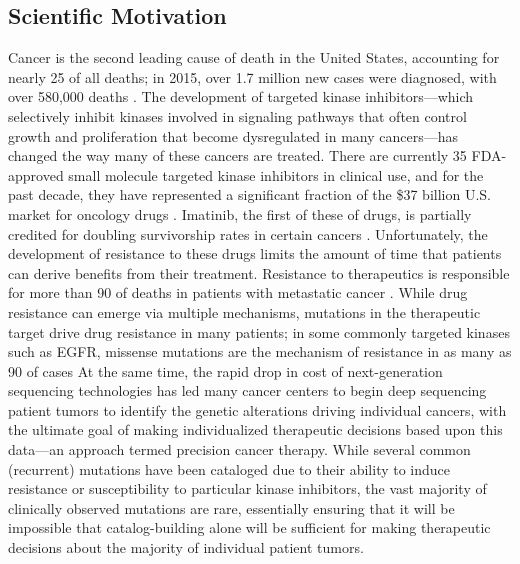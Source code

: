 \documentclass[conference]{IEEEtran}
\begin{document}

\subsection{Scientific Motivation}\label{sec:motivation}

Cancer is the second leading cause of death in the United States, accounting for nearly 25 of all deaths; in 2015, over 1.7 million new cases were diagnosed, with over 580,000 deaths \cite{acs-cancer-facts-2015}. The development of targeted kinase inhibitors—which selectively inhibit kinases involved in signaling pathways that often control growth and proliferation that become dysregulated in many cancers—has changed the way many of these cancers are treated. There are currently 35 FDA-approved small molecule targeted kinase inhibitors in clinical use, and for the past decade, they have represented a significant fraction of the \$37 billion U.S. market for oncology drugs \cite{FDA}. Imatinib, the first of these of drugs, is partially credited for doubling survivorship rates in certain cancers \cite{ACSreport}. Unfortunately, the development of resistance to these drugs limits the amount of time that patients can derive benefits from their treatment. Resistance to therapeutics is responsible for more than 90 of deaths in patients with metastatic cancer \cite{90death}. While drug resistance can emerge via multiple mechanisms, mutations in the therapeutic target drive drug resistance in many patients; in some commonly targeted kinases such as EGFR, missense mutations are the mechanism of resistance in as many as 90 of cases
At the same time, the rapid drop in cost of next-generation sequencing technologies has led many cancer centers to begin deep sequencing patient tumors to identify the genetic alterations driving individual cancers, with the ultimate goal of making individualized therapeutic decisions based upon this data—an approach termed precision cancer therapy. While several common (recurrent) mutations have been cataloged due to their ability to induce resistance or susceptibility to particular kinase inhibitors, the vast majority of clinically observed mutations are rare, essentially ensuring that it will be impossible that catalog-building alone will be sufficient for making therapeutic decisions about the majority of individual patient tumors.
\end{document}
